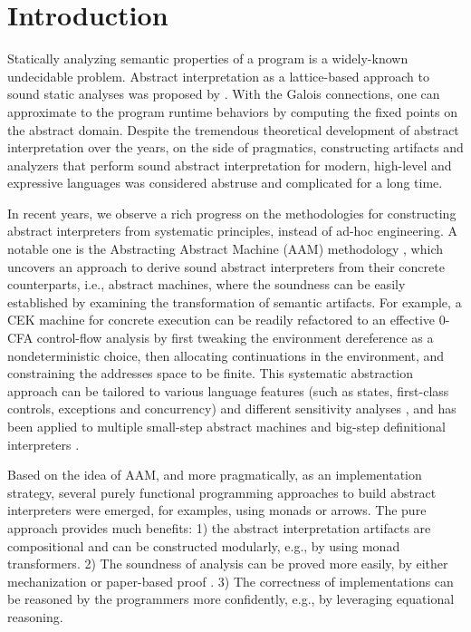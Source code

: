 \section{Introduction} \label{intro}

Statically analyzing semantic properties of a program is a
widely-known undecidable problem. Abstract interpretation as a
lattice-based approach to sound static analyses was proposed
by \citet{DBLP:conf/popl/CousotC77}. With the Galois connections, one
can approximate to the program runtime behaviors by computing the
fixed points on the abstract domain. Despite the tremendous
theoretical development of abstract interpretation over the years, on
the side of pragmatics, constructing artifacts and analyzers that
perform sound abstract interpretation for modern, high-level and
expressive languages was considered abstruse and complicated for a
long time.

In recent years, we observe a rich progress on the methodologies for
constructing abstract interpreters from systematic principles, instead
of ad-hoc engineering. A notable one is the Abstracting Abstract
Machine (AAM) methodology \cite{DBLP:journals/jfp/HornM12,
  DBLP:conf/icfp/HornM10}, which uncovers an approach to derive sound
abstract interpreters from their concrete counterparts, i.e., abstract
machines, where the soundness can be easily established by examining
the transformation of semantic artifacts. For example, a CEK machine
\cite{DBLP:conf/popl/FelleisenF87} for concrete execution can be
readily refactored to an effective $0$-CFA control-flow analysis
\cite{Shivers:1988:CFA:53990.54007,
  Midtgaard:2012:CAF:2187671.2187672} by first tweaking the
environment dereference as a nondeterministic choice, then allocating
continuations in the environment, and constraining the addresses space
to be finite. This systematic abstraction approach can be tailored to
various language features (such as states, first-class controls,
exceptions and concurrency) and different sensitivity analyses
\cite{DBLP:conf/icfp/Gilray0M16, DBLP:conf/popl/GilrayL0MH16,
  Darais:2015:GTM:2814270.2814308}, and has been applied to multiple
small-step abstract machines \cite{DBLP:journals/jfp/HornM12,
  DBLP:conf/icfp/HornM10, Sergey:2013:MAI:2491956.2491979} and
big-step definitional interpreters \cite{Wei:2018:RAA:3243631.3236800,
  DBLP:journals/pacmpl/DaraisLNH17, Keidel:2018:CSP:3243631.3236767}.

Based on the idea of AAM, and more pragmatically, as an implementation
strategy, several purely functional programming approaches to build
abstract interpreters were emerged, for examples, using monads or
arrows. The pure approach provides much benefits: 1) the abstract
interpretation artifacts are compositional and can be constructed
modularly, e.g., by using monad transformers. 2) The soundness of
analysis can be proved more easily, by either mechanization
\cite{Darais:2016:CGC:2951913.2951934} or paper-based proof
\cite{Keidel:2018:CSP:3243631.3236767}.  3) The correctness of
implementations can be reasoned by the programmers more confidently,
e.g., by leveraging equational reasoning.

